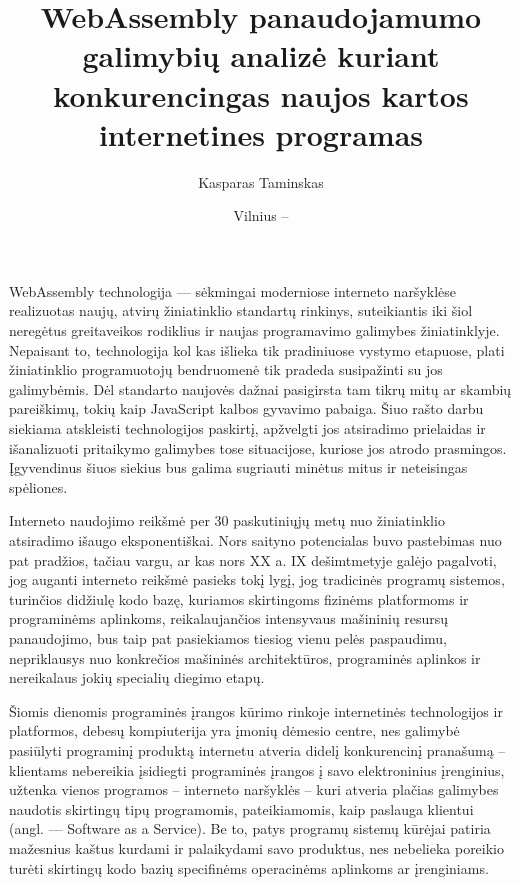 \documentclass{VUMIFPSkursinis}
\title{WebAssembly panaudojamumo galimybių analizė kuriant konkurencingas naujos kartos internetines programas }
\author{Kasparas Taminskas}
\date{Vilnius – \the\year}
\begin{document}
\lstset{language=C}

\maketitle
\cleardoublepage{}
\setcounter{page}{2}

\tableofcontents

WebAssembly technologija — sėkmingai moderniose interneto naršyklėse realizuotas naujų, atvirų žiniatinklio standartų rinkinys, suteikiantis iki šiol neregėtus greitaveikos rodiklius ir naujas programavimo galimybes žiniatinklyje. Nepaisant to, technologija kol kas išlieka tik pradiniuose vystymo etapuose, plati žiniatinklio programuotojų bendruomenė tik pradeda susipažinti su jos galimybėmis. Dėl standarto naujovės dažnai pasigirsta tam tikrų mitų ar skambių pareiškimų, tokių kaip JavaScript kalbos gyvavimo pabaiga. Šiuo rašto darbu siekiama atskleisti technologijos paskirtį, apžvelgti jos atsiradimo prielaidas ir išanalizuoti pritaikymo galimybes tose situacijose, kuriose jos atrodo prasmingos. Įgyvendinus šiuos siekius bus galima sugriauti minėtus mitus ir neteisingas spėliones.

Interneto naudojimo reikšmė per 30 paskutiniųjų metų nuo žiniatinklio atsiradimo išaugo 
eksponentiškai. Nors saityno potencialas buvo pastebimas nuo pat pradžios, tačiau vargu, ar 
kas nors XX a. IX dešimtmetyje galėjo pagalvoti, jog auganti interneto reikšmė pasieks tokį 
lygį, jog tradicinės programų sistemos, turinčios didžiulę kodo bazę, kuriamos skirtingoms 
fizinėms platformoms ir programinėms aplinkoms, reikalaujančios intensyvaus mašininių resursų 
panaudojimo, bus taip pat pasiekiamos tiesiog vienu pelės paspaudimu, nepriklausys nuo 
konkrečios mašininės architektūros, programinės aplinkos ir nereikalaus jokių specialių 
diegimo etapų.

Šiomis dienomis programinės įrangos kūrimo rinkoje internetinės technologijos ir 
platformos, debesų kompiuterija yra įmonių dėmesio centre, nes galimybė pasiūlyti programinį 
produktą internetu atveria didelį konkurencinį pranašumą – klientams nebereikia įsidiegti 
programinės įrangos į savo elektroninius įrenginius, užtenka vienos programos – interneto 
naršyklės – kuri atveria plačias galimybes naudotis skirtingų tipų programomis, pateikiamomis, 
kaip paslauga klientui (angl. — Software as a Service). Be to, patys programų sistemų kūrėjai 
patiria mažesnius kaštus kurdami ir palaikydami savo produktus, nes nebelieka poreikio turėti 
skirtingų kodo bazių specifinėms operacinėms aplinkoms ar įrenginiams.
\end{document}
